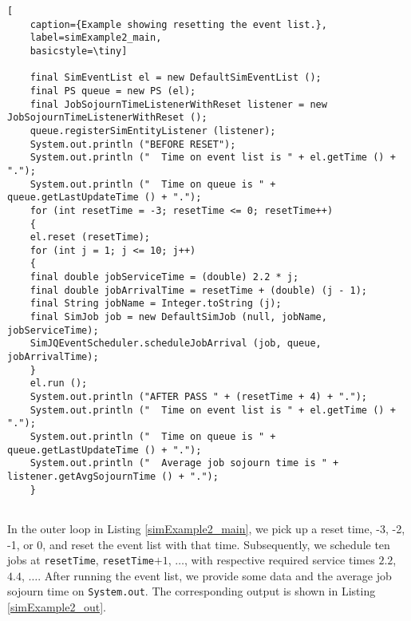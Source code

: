 \begin{lstfloat}
	\begin{lstlisting}[
	caption={Example showing resetting the event list.},
	label=simExample2_main,
	basicstyle=\tiny]
	
	final SimEventList el = new DefaultSimEventList ();
	final PS queue = new PS (el);
	final JobSojournTimeListenerWithReset listener = new JobSojournTimeListenerWithReset ();
	queue.registerSimEntityListener (listener);
	System.out.println ("BEFORE RESET");
	System.out.println ("  Time on event list is " + el.getTime () + ".");
	System.out.println ("  Time on queue is " + queue.getLastUpdateTime () + ".");
	for (int resetTime = -3; resetTime <= 0; resetTime++)
	{
	el.reset (resetTime);
	for (int j = 1; j <= 10; j++)
	{
	final double jobServiceTime = (double) 2.2 * j;
	final double jobArrivalTime = resetTime + (double) (j - 1);
	final String jobName = Integer.toString (j);
	final SimJob job = new DefaultSimJob (null, jobName, jobServiceTime);
	SimJQEventScheduler.scheduleJobArrival (job, queue, jobArrivalTime);
	}
	el.run ();
	System.out.println ("AFTER PASS " + (resetTime + 4) + ".");
	System.out.println ("  Time on event list is " + el.getTime () + ".");
	System.out.println ("  Time on queue is " + queue.getLastUpdateTime () + ".");
	System.out.println ("  Average job sojourn time is " + listener.getAvgSojournTime () + ".");
	}
	
	\end{lstlisting}
\end{lstfloat}

In the outer loop in Listing \ref{simExample2_main},
we pick up a reset time,
-3, -2, -1, or 0,
and reset the event list with that time.
Subsequently, we schedule ten jobs
at \lstinline|resetTime|, \lstinline|resetTime|$+1$, $\ldots$,
with respective required service times
$2.2$, $4.4$, $\ldots$.
After running the event list,
we provide some data and the average job sojourn time on \lstinline|System.out|.
The corresponding output is shown in Listing \ref{simExample2_out}.

